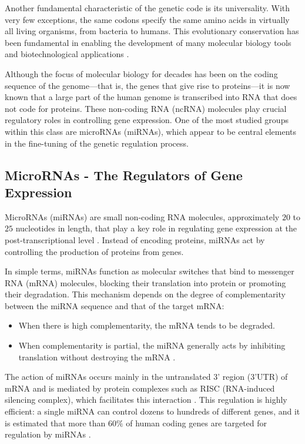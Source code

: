 Another fundamental characteristic of the genetic code is its universality. With very few exceptions, the same codons specify the 
same amino acids in virtually all living organisms, from bacteria to humans. This evolutionary conservation has been fundamental in 
enabling the development of many molecular biology tools and biotechnological applications \textcite{genetic_codeKoonin2017}.

Although the focus of molecular biology for decades has been on the coding sequence of the genome—that is, the genes that give rise 
to proteins—it is now known that a large part of the human genome is transcribed into RNA that does not code for proteins. 
These non-coding RNA (ncRNA) molecules play crucial regulatory roles in controlling gene expression. One of the most studied groups 
within this class are microRNAs (miRNAs), which appear to be central elements in the fine-tuning of the genetic regulation process.

\subsection*{MicroRNAs - The Regulators of Gene Expression}
MicroRNAs (miRNAs) are small non-coding RNA molecules, approximately $20$ to $25$ nucleotides in length, that play a key 
role in regulating gene expression at the post-transcriptional level \textcite{regulatory_mecha_mirnaGulyaeva2016, first_mirna_Ambros1993,post_transcript_wightman1993}. 
Instead of encoding proteins, miRNAs act by controlling the production of proteins from genes.

In simple terms, miRNAs function as molecular switches that bind to messenger RNA (mRNA) molecules, blocking their 
translation into protein or promoting their degradation. This mechanism depends on the degree of complementarity 
between the miRNA sequence and that of the target mRNA:
\begin{itemize}
    \item When there is high complementarity, the mRNA tends to be degraded.
    \item When complementarity is partial, the miRNA generally acts by inhibiting translation without destroying the mRNA \textcite{role_mirna_Calaf2023}.
\end{itemize}

The action of miRNAs occurs mainly in the untranslated 3' region (3'UTR) of mRNA and is mediated by protein complexes 
such as RISC (RNA-induced silencing complex), which facilitates this interaction \textcite{regulatory_mecha_mirnaGulyaeva2016}. This regulation 
is highly efficient: a single miRNA can control dozens to hundreds of different genes, and it is estimated that more 
than $60\%$ of human coding genes are targeted for regulation by miRNAs \textcite{role_mirna_Calaf2023}.

